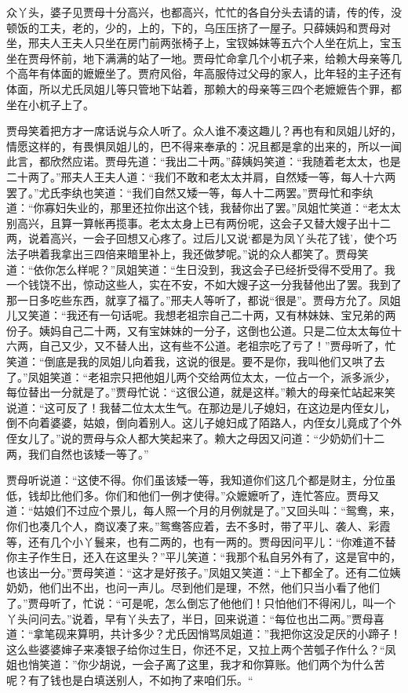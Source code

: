 \documentclass[12pt,oneside]{book}
\begin{document}
众丫头，婆子见贾母十分高兴，也都高兴，忙忙的各自分头去请的请，传的传，没顿饭的工夫，老的，少的，上的，下的，乌压压挤了一屋子。只薛姨妈和贾母对坐，邢夫人王夫人只坐在房门前两张椅子上，宝钗姊妹等五六个人坐在炕上，宝玉坐在贾母怀前，地下满满的站了一地。贾母忙命拿几个小杌子来，给赖大母亲等几个高年有体面的嬷嬷坐了。贾府风俗，年高服侍过父母的家人，比年轻的主子还有体面，所以尤氏凤姐儿等只管地下站着，那赖大的母亲等三四个老嬷嬷告个罪，都坐在小杌子上了。

贾母笑着把方才一席话说与众人听了。众人谁不凑这趣儿？再也有和凤姐儿好的，情愿这样的，有畏惧凤姐儿的，巴不得来奉承的：况且都是拿的出来的，所以一闻此言，都欣然应诺。贾母先道：“我出二十两。”薛姨妈笑道：“我随着老太太，也是二十两了。”邢夫人王夫人道：“我们不敢和老太太并肩，自然矮一等，每人十六两罢了。”尤氏李纨也笑道：“我们自然又矮一等，每人十二两罢。”贾母忙和李纨道：“你寡妇失业的，那里还拉你出这个钱，我替你出了罢。”凤姐忙笑道：“老太太别高兴，且算一算帐再揽事。老太太身上已有两份呢，这会子又替大嫂子出十二两，说着高兴，一会子回想又心疼了。过后儿又说‘都是为凤丫头花了钱’，使个巧法子哄着我拿出三四倍来暗里补上，我还做梦呢。”说的众人都笑了。贾母笑道：“依你怎么样呢？”凤姐笑道：“生日没到，我这会子已经折受得不受用了。我一个钱饶不出，惊动这些人，实在不安，不如大嫂子这一分我替他出了罢。我到了那一日多吃些东西，就享了福了。”邢夫人等听了，都说“很是”。贾母方允了。凤姐儿又笑道：“我还有一句话呢。我想老祖宗自己二十两，又有林妹妹、宝兄弟的两份子。姨妈自己二十两，又有宝妹妹的一分子，这倒也公道。只是二位太太每位十六两，自己又少，又不替人出，这有些不公道。老祖宗吃了亏了！”贾母听了，忙笑道：“倒底是我的凤姐儿向着我，这说的很是。要不是你，我叫他们又哄了去了。”凤姐笑道：“老祖宗只把他姐儿两个交给两位太太，一位占一个，派多派少，每位替出一分就是了。”贾母忙说：“这很公道，就是这样。”赖大的母亲忙站起来笑说道：“这可反了！我替二位太太生气。在那边是儿子媳妇，在这边是内侄女儿，倒不向着婆婆，姑娘，倒向着别人。这儿子媳妇成了陌路人，内侄女儿竟成了个外侄女儿了。”说的贾母与众人都大笑起来了。赖大之母因又问道：“少奶奶们十二两，我们自然也该矮一等了。”

贾母听说道：“这使不得。你们虽该矮一等，我知道你们这几个都是财主，分位虽低，钱却比他们多。你们和他们一例才使得。”众嬷嬷听了，连忙答应。贾母又道：“姑娘们不过应个景儿，每人照一个月的月例就是了。”又回头叫：“鸳鸯，来，你们也凑几个人，商议凑了来。”鸳鸯答应着，去不多时，带了平儿、袭人、彩霞等，还有几个小丫鬟来，也有二两的，也有一两的。贾母因问平儿：“你难道不替你主子作生日，还入在这里头？”平儿笑道：“我那个私自另外有了，这是官中的，也该出一分。”贾母笑道：“这才是好孩子。”凤姐又笑道：“上下都全了。还有二位姨奶奶，他们出不出，也问一声儿。尽到他们是理，不然，他们只当小看了他们了。”贾母听了，忙说：“可是呢，怎么倒忘了他他们！只怕他们不得闲儿，叫一个丫头问问去。”说着，早有丫头去了，半日，回来说道：“每位也出二两。”贾母喜道：“拿笔砚来算明，共计多少？尤氏因悄骂凤姐道：”我把你这没足厌的小蹄子！这么些婆婆婶子来凑银子给你过生日，你还不足，又拉上两个苦瓠子作什么？“凤姐也悄笑道：”你少胡说，一会子离了这里，我才和你算账。他们两个为什么苦呢？有了钱也是白填送别人，不如拘了来咱们乐。“
\end{document}
